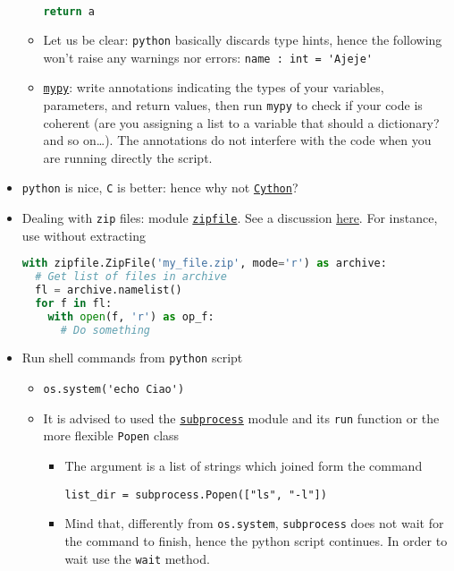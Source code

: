 \documentclass[a4paper,12pt,%
              final%
              ]{article}
\begin{document}
\begin{itemize}
\begin{itemize}
\begin{lstlisting}[language=python]
  return a
\end{lstlisting}
      \item Let us be clear: \texttt{python} basically discards type hints, hence the following won't raise any warnings nor errors: \verb|name : int = 'Ajeje'|
      \item \href{https://mypy.readthedocs.io/en/stable/index.html}{\texttt{mypy}}: write annotations indicating the types of your variables, parameters, and return values, then run \texttt{mypy} to check if your code is coherent (are you assigning a list to a variable that should a dictionary? and so on\ldots). The annotations do not interfere with the code when you are running directly the script.
    \end{itemize}
  \item \texttt{python} is nice, \texttt{C} is better: hence why not \href{https://cython.readthedocs.io/en/latest/index.html}{\texttt{Cython}}?
  \item Dealing with \texttt{zip} files: module \href{https://docs.python.org/3/library/zipfile.html}{\texttt{zipfile}}. See a discussion \href{https://realpython.com/python-zipfile/}{here}. For instance, use without extracting
\begin{lstlisting}[language=python]
with zipfile.ZipFile('my_file.zip', mode='r') as archive:
  # Get list of files in archive
  fl = archive.namelist()
  for f in fl:
    with open(f, 'r') as op_f:
      # Do something
\end{lstlisting}
  \item Run shell commands from \texttt{python} script
    \begin{itemize}
      \item \verb|os.system('echo Ciao')|
      \item It is advised to used the \href{https://docs.python.org/3/library/subprocess.html#subprocess.Popen.communicate}{\texttt{subprocess}} module and its \texttt{run} function or the more flexible \texttt{Popen} class
        \begin{itemize}
          \item The argument is a list of strings which joined form the command
\begin{verbatim}
list_dir = subprocess.Popen(["ls", "-l"])
\end{verbatim}
          \item Mind that, differently from \verb|os.system|, \texttt{subprocess} does not wait for the command to finish, hence the python script continues. In order to wait use the \texttt{wait} method.

\end{itemize}
\end{itemize}
\end{itemize}
\end{document}
